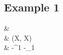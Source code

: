 \subsection{Example 1}

\begin{codealign}
  &
    \identity
    \prd
    \FunXX\
    \by
  \\[-3pt]
  &\quad
    \Apply(\prd X, \con X)
    \colon
  \\[-3pt]
  &\quad\quad
    \FunXX\textsc{-}\Apply^{1}
    \mkCmd
    \FunXX\textsc{-}\Apply_{1}
\end{codealign}
